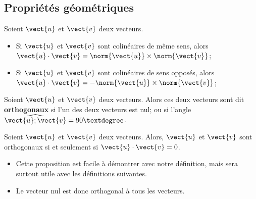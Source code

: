 \documentclass{article}
\begin{document}
\subsection{Propriétés géométriques}
\begin{proposition}
Soient $\vect{u}$ et $\vect{v}$ deux vecteurs.
\begin{itemize}
\item Si $\vect{u}$ et $\vect{v}$ sont colinéaires de même sens, alors $\vect{u} \cdot \vect{v} = \norm{\vect{u}} \times \norm{\vect{v}}$; 
\item Si $\vect{u}$ et $\vect{v}$ sont colinéaires de sens opposés, alors $\vect{u} \cdot \vect{v} = - \norm{\vect{u}} \times \norm{\vect{v}}$; 
\end{itemize}    
\end{proposition}
\begin{tcolorbox}
\begin{definition}
Soient $\vect{u}$ et $\vect{v}$ deux vecteurs. Alors ces deux vecteurs sont dit \textbf{orthogonaux} si l'un des deux vecteurs est nul; ou si l'angle $\widehat{\vect{u};\vect{v}} = 90°$.
\end{definition}
\end{tcolorbox}
\begin{proposition}
Soient $\vect{u}$ et $\vect{v}$ deux vecteurs. Alors, $\vect{u}$ et $\vect{v}$ sont orthogonaux si et seulement si $\vect{u} \cdot \vect{v} = 0$.    
\end{proposition}
\begin{remark}
\begin{itemize}
\item Cette proposition est facile à démontrer avec notre définition, mais sera surtout utile avec les définitions suivantes.
\item Le vecteur nul est donc orthogonal à tous les vecteurs.
\end{itemize}
\end{remark}
\end{document}

